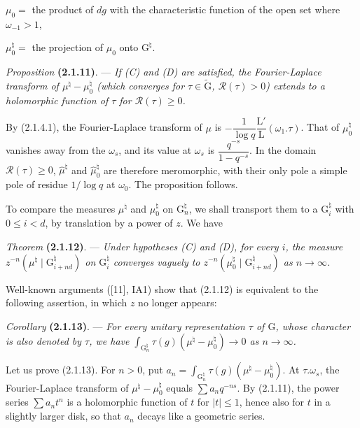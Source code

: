 \documentclass[11pt,leqno]{article}
\begin{document}
\noindent \(\mu_0=\) the product of \(dg\) with the characteristic function of the open set where \(\omega_{-1}>1\),

\noindent \(\mu_0^{\natural}=\) the projection of \(\mu_0\) onto \(\mathrm{G}^{\natural}\).

\textit{Proposition} \textbf{(2.1.11)}. — \textit{If \textup{(C)} and \textup{(D)} are satisfied, the Fourier-Laplace transform of \(\mu^{\natural}-\mu_0^{\natural}\) (which converges for \(\tau\in\widetilde{\mathrm{G}}\), \(\mathscr{R}(\tau)>0\)) extends to a holomorphic function of \(\tau\) for \(\mathscr{R}(\tau)\geq0\).}

By (2.1.4.1), the Fourier-Laplace transform of \(\mu\) is \(-\dfrac{1}{\log q}\dfrac{\mathrm{L}'}{\mathrm{L}}(\omega_1.\tau)\). That of \(\mu_0^{\natural}\) vanishes away from the \(\omega_s\), and its value at \(\omega_s\) is \(\dfrac{q^{-s}}{1-q^{-s}}\). In the domain \(\mathscr{R}(\tau)\geq0\), \(\widehat{\mu}^{\natural}\) and \(\widehat{\mu}_0^{\natural}\) are therefore meromorphic, with their only pole a simple pole of residue \(1/\log q\) at \(\omega_0\). The proposition follows.

To compare the measures \(\mu^{\natural}\) and \(\mu_0^{\natural}\) on \(\mathrm{G}_n^{\natural}\), we shall transport them to a \(\mathrm{G}_i^{\natural}\) with \(0\leq i<d\), by translation by a power of \(z\). We have

\textit{Theorem} \textbf{(2.1.12)}. — \textit{Under hypotheses \textup{(C)} and \textup{(D)}, for every \(i\), the measure \(z^{-n}(\mu^{\natural}\mid\mathrm{G}_{i+nd}^{\natural})\) on \(\mathrm{G}_i^{\natural}\) converges vaguely to \(z^{-n}(\mu_0^{\natural}\mid\mathrm{G}_{i+nd}^{\natural})\) as \(n\to\infty\).}

Well-known arguments ([11], IA1) show that (2.1.12) is equivalent to the following assertion, in which \(z\) no longer appears:

\textit{Corollary} \textbf{(2.1.13)}. — \textit{For every unitary representation \(\tau\) of \(\mathrm{G}\), whose character is also denoted by \(\tau\), we have \(\displaystyle\int_{\mathrm{G}_n^{\natural}}\tau(g)(\mu^{\natural}-\mu_0^{\natural})\to0\) as \(n\to\infty\).}

Let us prove (2.1.13). For \(n>0\), put \(a_n=\displaystyle\int_{\mathrm{G}_n^{\natural}}\tau(g)(\mu^{\natural}-\mu_0^{\natural})\). At \(\tau.\omega_s\), the Fourier-Laplace transform of \(\mu^{\natural}-\mu_0^{\natural}\) equals \(\sum a_nq^{-ns}\). By (2.1.11), the power series \(\sum a_nt^n\) is a holomorphic function of \(t\) for \(|t|\leq1\), hence also for \(t\) in a slightly larger disk, so that \(a_n\) decays like a geometric series.
\end{document}
